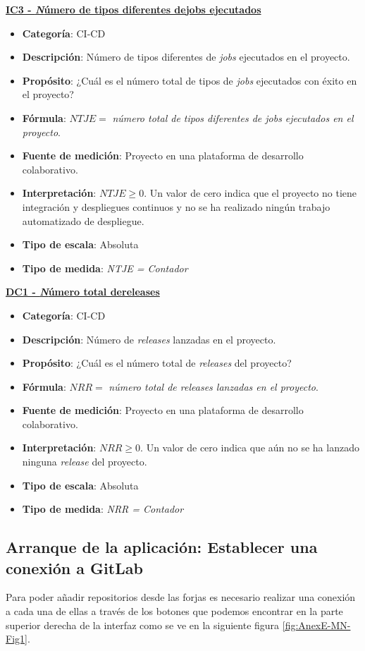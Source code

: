 \textbf{\underline{IC3 - \textit Número de tipos diferentes de{jobs} ejecutados}}
\begin{itemize}
	\item \textbf{Categoría}: CI-CD
	\item \textbf{Descripción}: Número de tipos diferentes de \textit{jobs} ejecutados en el proyecto.
	\item \textbf{Propósito}: ¿Cuál es el número total de tipos de \textit{jobs} ejecutados con éxito en el proyecto?
	\item \textbf{Fórmula}: $NTJE =$ \textit{número total de tipos diferentes de jobs ejecutados en el proyecto}.
	\item \textbf{Fuente de medición}: Proyecto en una plataforma de desarrollo colaborativo.
	\item \textbf{Interpretación}: $NTJE \geq 0$. Un valor de cero indica que el proyecto no tiene integración y despliegues continuos y no se ha realizado ningún trabajo automatizado de despliegue.
	\item \textbf{Tipo de escala}: Absoluta
	\item \textbf{Tipo de medida}: \textit{NTJE = Contador}
\end{itemize}

\textbf{\underline{DC1 - \textit Número total de{releases}}}
\begin{itemize}
	\item \textbf{Categoría}: CI-CD
	\item \textbf{Descripción}: Número de \textit{releases} lanzadas en el proyecto.
	\item \textbf{Propósito}: ¿Cuál es el número total de \textit{releases} del  proyecto?
	\item \textbf{Fórmula}: $NRR =$ \textit{número total de releases lanzadas en el proyecto}.
	\item \textbf{Fuente de medición}: Proyecto en una plataforma de desarrollo colaborativo.
	\item \textbf{Interpretación}: $NRR \geq 0$. Un valor de cero indica que aún no se ha lanzado ninguna \textit{release} del proyecto.
	\item \textbf{Tipo de escala}: Absoluta
	\item \textbf{Tipo de medida}: \textit{NRR = Contador}
\end{itemize}

\subsection{Arranque de la aplicación: Establecer una conexión a GitLab}
Para poder añadir repositorios desde las forjas es necesario realizar una conexión a cada una de ellas a través de los botones que podemos encontrar en la parte superior derecha de la interfaz como se ve en la siguiente figura \ref{fig:AnexE-MN-Fig1}.

